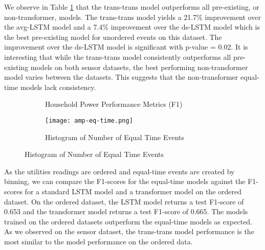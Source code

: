 \documentclass[reqno ,11pt]{article}
\begin{document}
We observe in Table \ref{tab:AMP-metrics} that the trans-trans model outperforms all pre-existing, or non-transformer, models. The trans-trans model yields a 21.7\% improvement over the avg-LSTM model and a 7.4\% improvement over the ds-LSTM model which is the best pre-existing model for unordered events on this dataset. The improvement over the ds-LSTM model is significant with p-value = 0.02. It is interesting that while the trans-trans model consistently outperforms all pre-existing models on both sensor datasets, the best performing non-transformer model varies between the datasets. This suggests that the non-transformer  equal-time models lack consistency. 

\begin{figure}[H]
\centering
\begin{subfigure}[t]{.3\textwidth}
\centering
\caption{Household Power Performance Metrics (F1)}

\label{tab:AMP-metrics}
\end{subfigure}
\begin{subfigure}[t]{0.66\textwidth}
 \caption{Histogram of Number of Equal Time Events}
\centering
\texttt{[image: amp-eq-time.png]}
  \label{fig:amp-eq-time}
\end{subfigure}
\end{figure}

As the utilities readings are ordered and equal-time events are created by binning, we can compare the F1-scores for the equal-time models against the F1-scores for a standard LSTM model and a transformer model on the ordered dataset. On the ordered dataset, the LSTM model returns a test F1-score of 0.653 and the transformer model returns a test F1-score of 0.665. The models trained on the ordered datasets outperform the equal-time models as expected. As we observed on the sensor dataset, the trans-trans model performance is the most similar to the model performance on the ordered data. 
\end{document}
